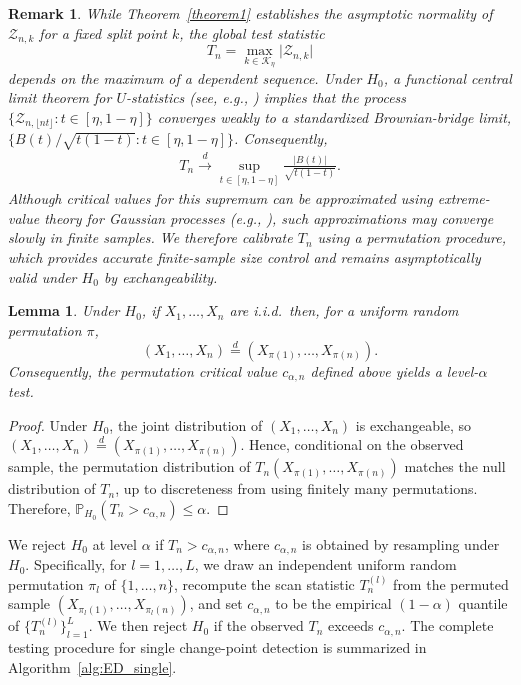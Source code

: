 \documentclass[11pt]{article}
\numberwithin{theorem}{section}
\newtheorem{Lemma}{Lemma}
\numberwithin{Lemma}{section}
\newtheorem{remark}{Remark}
\numberwithin{Definition}{section}
\begin{document}
\begin{remark}\label{rem:process_limit}
While Theorem~\ref{theorem1} establishes the asymptotic normality of $\mathcal{Z}_{n,k}$ for a fixed split point $k$,
the global test statistic
\[
T_n=\max_{k\in\mathcal{K}_\eta}\bigl|\mathcal{Z}_{n,k}\bigr|
\]
depends on the \emph{maximum} of a dependent sequence. Under $H_0$, a functional central limit theorem for
$U$-statistics (see, e.g., \cite{cs1997, DehlingVukWendler2022}) implies that the process
$\{\mathcal{Z}_{n,\lfloor nt\rfloor}: t\in[\eta,1-\eta]\}$ converges weakly to a standardized Brownian-bridge limit,
$\{B(t)/\sqrt{t(1-t)}: t\in[\eta,1-\eta]\}$. Consequently,
\begin{equation}
\begin{aligned}
T_n \xrightarrow{d} \sup_{t\in[\eta,1-\eta]} \frac{|B(t)|}{\sqrt{t(1-t)}}.
\end{aligned}
\end{equation}
Although critical values for this supremum can be approximated using extreme-value theory for Gaussian processes
(e.g., \cite{gombay1995}), such approximations may converge slowly in finite samples. We therefore calibrate $T_n$
using a permutation procedure, which provides accurate finite-sample size control and remains asymptotically valid
under $H_0$ by exchangeability.
\end{remark}

\begin{Lemma}\label{lem:perm_level}
Under $H_0$, if $X_1,\dots,X_n$ are i.i.d.\ then, for a uniform random permutation $\pi$,
\[
(X_1,\dots,X_n)\stackrel{d}{=}(X_{\pi(1)},\dots,X_{\pi(n)}).
\]
Consequently, the permutation critical value $c_{\alpha,n}$ defined above yields a level-$\alpha$ test.
\end{Lemma}

\begin{proof}
Under $H_0$, the joint distribution of $(X_1,\dots,X_n)$ is exchangeable, so
$(X_1,\dots,X_n)\stackrel{d}{=}(X_{\pi(1)},\dots,X_{\pi(n)})$. Hence, conditional on the observed sample,
the permutation distribution of $T_n(X_{\pi(1)},\dots,X_{\pi(n)})$ matches the null distribution of $T_n$,
up to discreteness from using finitely many permutations. Therefore,
$\mathbb{P}_{H_0}(T_n>c_{\alpha,n})\le \alpha$.
\end{proof}


We reject $H_0$ at level $\alpha$ if $T_n>c_{\alpha,n}$, where $c_{\alpha,n}$ is obtained by resampling under $H_0$.
Specifically, for $l=1,\dots,L$, we draw an independent uniform random permutation $\pi_l$ of $\{1,\dots,n\}$,
recompute the scan statistic $T_n^{(l)}$ from the permuted sample $(X_{\pi_l(1)},\dots,X_{\pi_l(n)})$, and set
$c_{\alpha,n}$ to be the empirical $(1-\alpha)$ quantile of $\{T_n^{(l)}\}_{l=1}^L$. We then reject $H_0$ if
the observed $T_n$ exceeds $c_{\alpha,n}$. The complete testing procedure for single change-point detection is summarized in Algorithm~\ref{alg:ED_single}.
\end{document}
